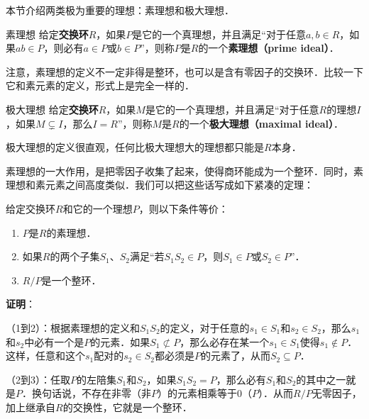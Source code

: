 

本节介绍两类极为重要的理想：素理想和极大理想．





\begin{definition}{素理想}
给定\textbf{交换环}$R$，如果$P$是它的一个真理想，并且满足“对于任意$a, b\in R$，如果$ab\in P$，则必有$a\in P$或$b\in P$”，则称$P$是$R$的一个\textbf{素理想（prime ideal）}．
\end{definition}

注意，素理想的定义不一定非得是整环，也可以是含有零因子的交换环．比较一下它和素元素的定义，形式上是完全一样的．

\begin{definition}{极大理想}
给定\textbf{交换环}$R$，如果$M$是它的一个真理想，并且满足“对于任意$R$的理想$I$，如果$M\subsetneq I$，那么$I=R$”，则称$M$是$R$的一个\textbf{极大理想（maximal ideal）}．
\end{definition}

极大理想的定义很直观，任何比极大理想大的理想都只能是$R$本身．

素理想的一大作用，是把零因子收集了起来，使得商环能成为一个整环．同时，素理想和素元素之间高度类似．我们可以把这些话写成如下紧凑的定理：

\begin{theorem}{}
给定交换环$R$和它的一个理想$P$，则以下条件等价：
\begin{enumerate}
\item $P$是$R$的素理想．
\item 如果$R$的两个子集$S_1$、$S_2$满足“若$S_1S_2\in P$，则$S_1\in P$或$S_2\in P$”．
\item $R/P$是一个整环．
\end{enumerate}
\end{theorem}

\textbf{证明}：

（1到2）：根据素理想的定义和$S_1S_2$的定义，对于任意的$s_1\in S_1$和$s_2\in S_2$，那么$s_1$和$s_2$中必有一个是$P$的元素．如果$S_1\not\subset P$，那么必存在某一个$s_1\in S_1$使得$s_1\not\in P$．这样，任意和这个$s_1$配对的$s_2\in S_2$都必须是$P$的元素了，从而$S_2\subseteq P$．

（2到3）：任取$P$的左陪集$S_1$和$S_2$，如果$S_1S_2=P$，那么必有$S_1$和$S_2$的其中之一就是$P$．换句话说，不存在非零（非$P$）的元素相乘等于$0$（$P$）．从而$R/P$无零因子，加上继承自$R$的交换性，它就是一个整环．

